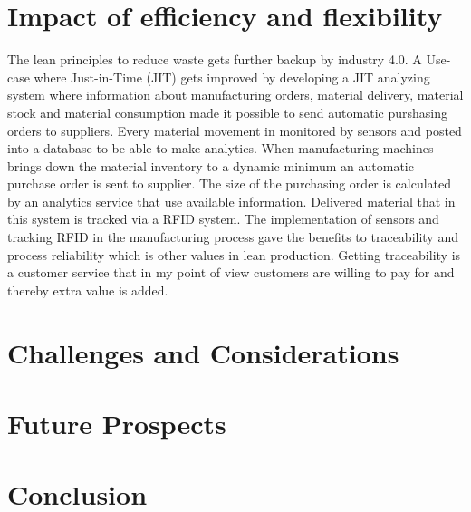 \documentclass[article,a4paper]{IEEEtran}
\begin{document}
    \section{Impact of efficiency and flexibility}
    The lean principles to reduce waste gets further backup by industry 4.0. A Use-case where Just-in-Time (JIT) gets improved by developing a JIT analyzing system where information about manufacturing orders, material delivery, material stock and material consumption made it possible to send automatic purshasing orders to suppliers. Every material movement in monitored by sensors and posted into a database to be able to make analytics. When manufacturing machines brings down the material inventory to a dynamic minimum an automatic purchase order is sent to supplier. The size of the purchasing order is calculated by an analytics service that use available information. Delivered material that in this system is tracked via a RFID system. The implementation of sensors and tracking RFID in the manufacturing process gave the benefits to traceability \cite{Impact_Lean_Prod} and process reliability which is other values in lean production. Getting traceability is a customer service that in my point of view customers are willing to pay for and thereby extra value is added. 


    
    
    
    \section{Challenges and Considerations}

    \section{Future Prospects}

    \section{Conclusion}


\printbibliography
\end{document}
